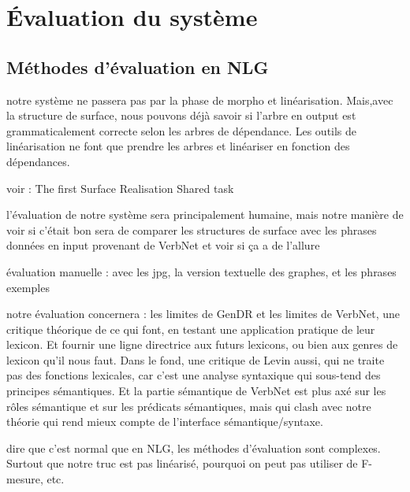 \chapter{Évaluation du système}


\section{Méthodes d'évaluation en NLG}

notre système ne passera pas par la phase de morpho et linéarisation. Mais,avec la structure de surface, nous pouvons déjà savoir si l'arbre en output est grammaticalement correcte selon les arbres de dépendance. Les outils de linéarisation ne font que prendre les arbres et linéariser en fonction des dépendances. 

voir : The first Surface Realisation Shared task

l'évaluation de notre système sera principalement humaine, mais notre manière de voir si c'était bon sera de comparer les structures de surface avec les phrases données en input provenant de VerbNet et voir si ça a de l'allure

évaluation manuelle : avec les jpg, la version textuelle des graphes, et les phrases exemples

notre évaluation concernera : les limites de GenDR et les limites de VerbNet, une critique théorique de ce qui font, en testant une application pratique de leur lexicon. Et fournir une ligne directrice aux futurs lexicons, ou bien aux genres de lexicon qu'il nous faut. Dans le fond, une critique de Levin aussi, qui ne traite pas des fonctions lexicales, car c'est une analyse syntaxique qui sous-tend des principes sémantiques. Et la partie sémantique de VerbNet est plus axé sur les rôles sémantique et sur les prédicats sémantiques, mais qui clash avec notre théorie qui rend mieux compte de l'interface sémantique/syntaxe.

dire que c'est normal que en NLG, les méthodes d'évaluation sont complexes. Surtout que notre truc est pas linéarisé, pourquoi on peut pas utiliser de F-mesure, etc.
